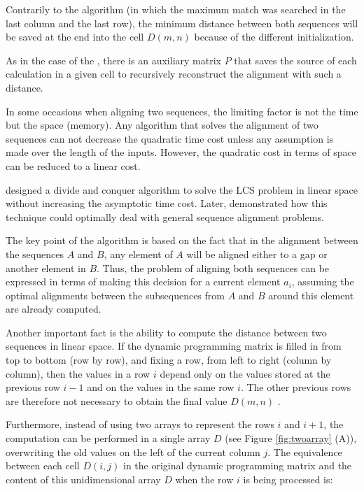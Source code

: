 Contrarily to the \citeauthor{needleman:1970a} algorithm (in which the maximum match was searched in the 
last column and the last row), the minimum distance between both sequences will be saved at the end into 
the cell $D(m,n)$ because of the different initialization.

As in the case of the \citeauthor{needleman:1970a}, there is an auxiliary matrix $P$ that saves the 
source of each calculation in a given cell to recursively reconstruct the alignment with such a distance.

\label{linearspace}

 
In some occasions when aligning two sequences, the limiting factor is not the time but the space (memory).
Any algorithm that solves the alignment of two sequences can not decrease the quadratic time cost unless
any assumption is made over the length of the inputs. However, the quadratic cost in terms of space can 
be reduced to a linear cost.

\citet{hirschberg:1975a} designed a divide and conquer algorithm to solve the LCS problem in linear space
without increasing the asymptotic time cost. Later, \citet{myers:1988a} demonstrated how this technique
could optimally deal with general sequence alignment problems.

The key point of the algorithm is based on the fact that in the alignment between the sequences $A$ and
$B$, any element of $A$ will be aligned either to a gap or another element in $B$. Thus, the problem
of aligning both sequences can be expressed in terms of making this decision for a current element $a_i$,
assuming the optimal alignments between the subsequences from $A$ and $B$ around this element are already 
computed.

Another important fact is the ability to compute the distance between two sequences in linear space.
If the dynamic programming matrix is filled in from top to bottom (row by row), and fixing a row, from
left to right (column by column), then the values in a row $i$ depend only on the values stored at the 
previous row $i-1$ and on the values in the same row $i$. The other previous rows are therefore not necessary
to obtain the final value $D(m,n)$ \citep{myers:1991a,meidanis:1997a}.

Furthermore, instead of using two arrays to represent the rows $i$ and $i+1$, the computation can be 
performed in a single array $D$ (see Figure \ref{fig:twoarray} (A)), overwriting the old values on the left 
of the current column $j$. The equivalence between each cell $D(i,j)$ in the original dynamic programming matrix 
and the content of this unidimensional array $D$ when the row $i$ is being processed is:

